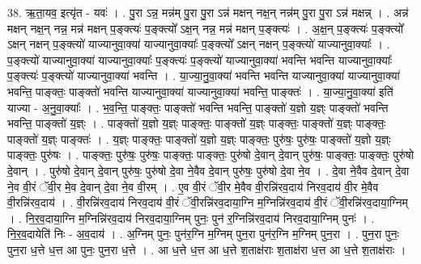 \documentclass[17pt]{extarticle}
\begin{document}
38. ऋ॒ता॒यव॒ इत्यृ॑त - यवः॑ । . पु॒रा ऽन्न॒ मन्न॑म् पु॒रा पु॒रा ऽन्न॑ मक्षन् नक्ष॒न् नन्न॑म् पु॒रा पु॒रा ऽन्न॑ मक्षन्न् । . अन्न॑ मक्षन् नक्ष॒न् नन्न॒ मन्न॑ मक्षन् प॒ङ्क्त्यः॑ प॒ङ्क्त्यो᳚ ऽक्ष॒न् नन्न॒ मन्न॑ मक्षन् प॒ङ्क्त्यः॑ । . अ॒क्ष॒न् प॒ङ्क्त्यः॑ प॒ङ्क्त्यो᳚ ऽक्षन् नक्षन् प॒ङ्क्त्यो॑ याज्यानुवा॒क्या॑ याज्यानुवा॒क्याः᳚ प॒ङ्क्त्यो᳚ ऽक्षन् नक्षन् प॒ङ्क्त्यो॑ याज्यानुवा॒क्याः᳚ । . प॒ङ्क्त्यो॑ याज्यानुवा॒क्या॑ याज्यानुवा॒क्याः᳚ प॒ङ्क्त्यः॑ प॒ङ्क्त्यो॑ याज्यानुवा॒क्या॑ भवन्ति भवन्ति याज्यानुवा॒क्याः᳚ प॒ङ्क्त्यः॑ प॒ङ्क्त्यो॑ याज्यानुवा॒क्या॑ भवन्ति । . या॒ज्या॒नु॒वा॒क्या॑ भवन्ति भवन्ति याज्यानुवा॒क्या॑ याज्यानुवा॒क्या॑ भवन्ति॒ पाङ्क्तः॒ पाङ्क्तो॑ भवन्ति याज्यानुवा॒क्या॑ याज्यानुवा॒क्या॑ भवन्ति॒ पाङ्क्तः॑ । . या॒ज्या॒नु॒वा॒क्या॑ इति॑ याज्या - अ॒नु॒वा॒क्याः᳚ । . भ॒व॒न्ति॒ पाङ्क्तः॒ पाङ्क्तो॑ भवन्ति भवन्ति॒ पाङ्क्तो॑ य॒ज्ञो य॒ज्ञ्ः पाङ्क्तो॑ भवन्ति भवन्ति॒ पाङ्क्तो॑ य॒ज्ञ्ः । . पाङ्क्तो॑ य॒ज्ञो य॒ज्ञ्ः पाङ्क्तः॒ पाङ्क्तो॑ य॒ज्ञ्ः पाङ्क्तः॒ पाङ्क्तो॑ य॒ज्ञ्ः पाङ्क्तः॒ पाङ्क्तो॑ य॒ज्ञ्ः पाङ्क्तः॑ । . य॒ज्ञ्ः पाङ्क्तः॒ पाङ्क्तो॑ य॒ज्ञो य॒ज्ञ्ः पाङ्क्तः॒ पुरु॑षः॒ पुरु॑षः॒ पाङ्क्तो॑ य॒ज्ञो य॒ज्ञ्ः पाङ्क्तः॒ पुरु॑षः । . पाङ्क्तः॒ पुरु॑षः॒ पुरु॑षः॒ पाङ्क्तः॒ पाङ्क्तः॒ पुरु॑षो दे॒वान् दे॒वान् पुरु॑षः॒ पाङ्क्तः॒ पाङ्क्तः॒ पुरु॑षो दे॒वान् । . पुरु॑षो दे॒वान् दे॒वान् पुरु॑षः॒ पुरु॑षो दे॒वा ने॒वैव दे॒वान् पुरु॑षः॒ पुरु॑षो दे॒वा ने॒व । . दे॒वा ने॒वैव दे॒वान् दे॒वा ने॒व वी॒रं ॅवी॒र मे॒व दे॒वान् दे॒वा ने॒व वी॒रम् । . ए॒व वी॒रं ॅवी॒र मे॒वैव वी॒रन्नि॑रव॒दाय॑ निरव॒दाय॑ वी॒र मे॒वैव वी॒रन्नि॑रव॒दाय॑ । . वी॒रन्नि॑रव॒दाय॑ निरव॒दाय॑ वी॒रं ॅवी॒रन्नि॑रव॒दाया॒ग्नि म॒ग्निन्नि॑रव॒दाय॑ वी॒रं ॅवी॒रन्नि॑रव॒दाया॒ग्निम् । . नि॒र॒व॒दाया॒ग्नि म॒ग्निन्नि॑रव॒दाय॑ निरव॒दाया॒ग्निम् पुनः॒ पुन॑ र॒ग्निन्नि॑रव॒दाय॑ निरव॒दाया॒ग्निम् पुनः॑ । . नि॒र॒व॒दायेति॑ निः - अ॒व॒दाय॑ । . अ॒ग्निम् पुनः॒ पुन॑र॒ग्नि म॒ग्निम् पुन॒रा पुन॑र॒ग्नि म॒ग्निम् पुन॒रा । . पुन॒रा पुनः॒ पुन॒रा ध॒त्ते ध॒त्त आ पुनः॒ पुन॒रा ध॒त्ते । . आ ध॒त्ते ध॒त्त आ ध॒त्ते श॒ताक्ष॑राः श॒ताक्ष॑रा ध॒त्त आ ध॒त्ते श॒ताक्ष॑राः । \newline
\pagebreak
{}
\end{document}
